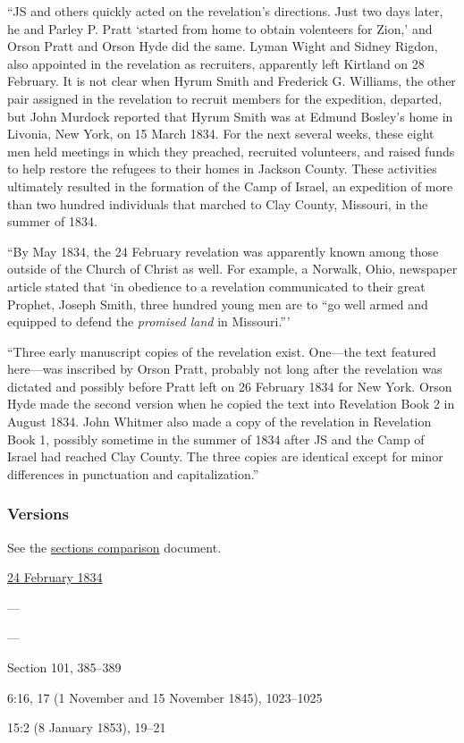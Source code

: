 			``JS and others quickly acted on the revelation's directions. Just two days later, he and Parley P. Pratt `started from home to obtain volenteers for Zion,' and Orson Pratt and Orson Hyde did the same. Lyman Wight and Sidney Rigdon, also appointed in the revelation as recruiters, apparently left Kirtland on 28 February. It is not clear when Hyrum Smith and Frederick G. Williams, the other pair assigned in the revelation to recruit members for the expedition, departed, but John Murdock reported that Hyrum Smith was at Edmund Bosley's home in Livonia, New York, on 15 March 1834. For the next several weeks, these eight men held meetings in which they preached, recruited volunteers, and raised funds to help restore the refugees to their homes in Jackson County. These activities ultimately resulted in the formation of the Camp of Israel, an expedition of more than two hundred individuals that marched to Clay County, Missouri, in the summer of 1834.
			
			``By May 1834, the 24 February revelation was apparently known among those outside of the Church of Christ as well. For example, a Norwalk, Ohio, newspaper article stated that `in obedience to a revelation communicated to their great Prophet, Joseph Smith, three hundred young men are to ``go well armed and equipped to defend the \textit{promised land} in Missouri.'''
			
			``Three early manuscript copies of the revelation exist. One---the text featured here---was inscribed by Orson Pratt, probably not long after the revelation was dictated and possibly before Pratt left on 26 February 1834 for New York. Orson Hyde made the second version when he copied the text into Revelation Book 2 in August 1834. John Whitmer also made a copy of the revelation in Revelation Book 1, possibly sometime in the summer of 1834 after JS and the Camp of Israel had reached Clay County. The three copies are identical except for minor differences in punctuation and capitalization.''
				
	\subsubsection{Versions}
		\label{DC103-V}
		
		See the \href{https://drive.google.com/file/d/1goAvNz8jS4R8slYfMG_db55Ty2z_vmgK/view?usp=sharing}{sections comparison} document.
	
		\begin{compactdesc}
			\item[JSP] \hyperref[EMS-1834-JS-24-FEB-1834]{24 February 1834}
			\item[BC] ---
			\item[DC 1835] ---
			\item[DC 1844] Section 101, 385--389
			\item[TS] 6:16, 17 (1 November and 15 November 1845), 1023--1025
			\item[MS] 15:2 (8 January 1853), 19--21
		\end{compactdesc}

